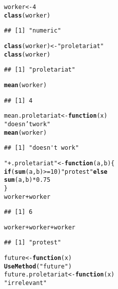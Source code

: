 \documentclass[twoside,twocolumn]{article}\usepackage[]{graphicx}\usepackage[dvipsnames]{xcolor}
\makeatletter
\newcommand{\hlnum}[1]{\textcolor[rgb]{0.686,0.059,0.569}{#1}}%
\newcommand{\hlstr}[1]{\textcolor[rgb]{0.192,0.494,0.8}{#1}}%
\newcommand{\hlopt}[1]{\textcolor[rgb]{0,0,0}{#1}}%
\newcommand{\hlstd}[1]{\textcolor[rgb]{0.345,0.345,0.345}{#1}}%
\newcommand{\hlkwa}[1]{\textcolor[rgb]{0.161,0.373,0.58}{\textbf{#1}}}%
\newcommand{\hlkwb}[1]{\textcolor[rgb]{0.69,0.353,0.396}{#1}}%
\newcommand{\hlkwc}[1]{\textcolor[rgb]{0.333,0.667,0.333}{#1}}%
\newcommand{\hlkwd}[1]{\textcolor[rgb]{0.737,0.353,0.396}{\textbf{#1}}}%
\newenvironment{kframe}{%
 \def\at@end@of@kframe{}%
 \ifinner\ifhmode%
  \def\at@end@of@kframe{\end{minipage}}%
  \begin{minipage}{\columnwidth}%
 \fi\fi%
 \def\FrameCommand##1{\hskip\@totalleftmargin \hskip-\fboxsep
 \colorbox{shadecolor}{##1}\hskip-\fboxsep
     \hskip-\linewidth \hskip-\@totalleftmargin \hskip\columnwidth}%
 \MakeFramed {\advance\hsize-\width
   \@totalleftmargin\z@ \linewidth\hsize
   \@setminipage}}%
 {\par\unskip\endMakeFramed%
 \at@end@of@kframe}
\newenvironment{knitrout}{}{} %
\makeatother
\begin{document}
\begin{knitrout}
\color{fgcolor}\begin{kframe}
\begin{alltt}
\hlstd{worker} \hlkwb{<-} \hlnum{4}
\hlkwd{class}\hlstd{(worker)}
\end{alltt}
\begin{verbatim}
## [1] "numeric"
\end{verbatim}
\begin{alltt}
\hlkwd{class}\hlstd{(worker)} \hlkwb{<-} \hlstr{"proletariat"}
\hlkwd{class}\hlstd{(worker)}
\end{alltt}
\begin{verbatim}
## [1] "proletariat"
\end{verbatim}
\begin{alltt}
\hlkwd{mean}\hlstd{(worker)}
\end{alltt}
\begin{verbatim}
## [1] 4
\end{verbatim}
\begin{alltt}
\hlstd{mean.proletariat} \hlkwb{<-} \hlkwa{function}\hlstd{(}\hlkwc{x}\hlstd{)}
  \hlstr{"doesn't work"}
\hlkwd{mean}\hlstd{(worker)}
\end{alltt}
\begin{verbatim}
## [1] "doesn't work"
\end{verbatim}
\begin{alltt}
\hlstr{"+.proletariat"} \hlkwb{<-} \hlkwa{function}\hlstd{(}\hlkwc{a}\hlstd{,} \hlkwc{b}\hlstd{) \{}
  \hlkwa{if} \hlstd{(}\hlkwd{sum}\hlstd{(a, b)} \hlopt{>=} \hlnum{10}\hlstd{)} \hlstr{"protest"} \hlkwa{else}
    \hlkwd{sum}\hlstd{(a, b)} \hlopt{*} \hlnum{0.75}
\hlstd{\}}
\hlstd{worker} \hlopt{+} \hlstd{worker}
\end{alltt}
\begin{verbatim}
## [1] 6
\end{verbatim}
\begin{alltt}
\hlstd{worker} \hlopt{+} \hlstd{worker} \hlopt{+} \hlstd{worker}
\end{alltt}
\begin{verbatim}
## [1] "protest"
\end{verbatim}
\begin{alltt}
\hlstd{future} \hlkwb{<-} \hlkwa{function}\hlstd{(}\hlkwc{x}\hlstd{)}
  \hlkwd{UseMethod}\hlstd{(}\hlstr{"future"}\hlstd{)}
\hlstd{future.proletariat} \hlkwb{<-} \hlkwa{function}\hlstd{(}\hlkwc{x}\hlstd{)}
  \hlstr{"irrelevant"}
\end{alltt}
\end{kframe}
\end{knitrout}
\end{document}
